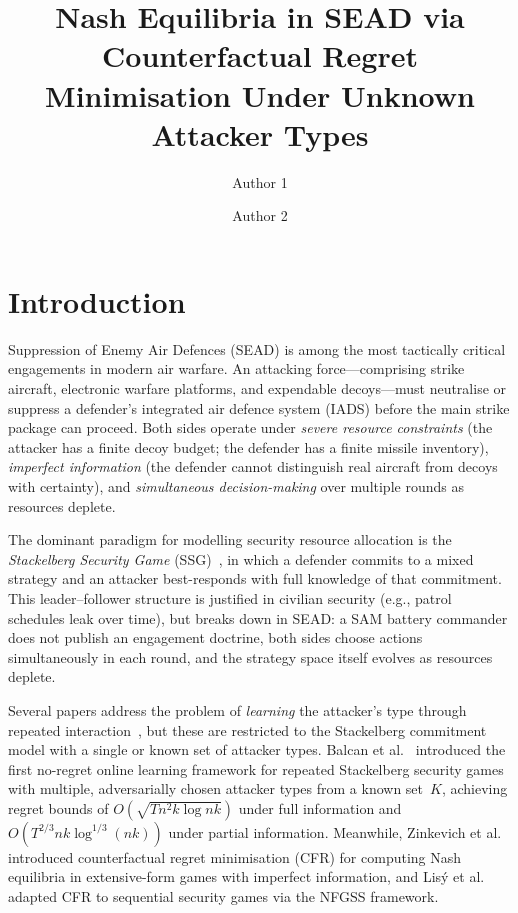 \documentclass[sigconf]{aamas}
\title{Nash Equilibria in SEAD via Counterfactual Regret Minimisation Under Unknown Attacker Types}
\author{Author 1}
\affiliation{
  \institution{IIT Madras}
  \city{Chennai}
  \country{India}}
\author{Author 2}
\affiliation{
  \institution{IIT Madras}
  \city{Chennai}
  \country{India}}
\begin{document}
\pagestyle{fancy}
\fancyhead{}

\maketitle

\section{Introduction}

Suppression of Enemy Air Defences (SEAD) is among the most tactically critical engagements in modern air warfare. An attacking force---comprising strike aircraft, electronic warfare platforms, and expendable decoys---must neutralise or suppress a defender's integrated air defence system (IADS) before the main strike package can proceed. Both sides operate under \emph{severe resource constraints} (the attacker has a finite decoy budget; the defender has a finite missile inventory), \emph{imperfect information} (the defender cannot distinguish real aircraft from decoys with certainty), and \emph{simultaneous decision-making} over multiple rounds as resources deplete.

The dominant paradigm for modelling security resource allocation is the \emph{Stackelberg Security Game} (SSG)~\cite{Tambe2012}, in which a defender commits to a mixed strategy and an attacker best-responds with full knowledge of that commitment. This leader--follower structure is justified in civilian security (e.g., patrol schedules leak over time), but breaks down in SEAD: a SAM battery commander does not publish an engagement doctrine, both sides choose actions simultaneously in each round, and the strategy space itself evolves as resources deplete.

Several papers address the problem of \emph{learning} the attacker's type through repeated interaction~\cite{Letchford2009, Marecki2012, Blum2014}, but these are restricted to the Stackelberg commitment model with a single or known set of attacker types. Balcan et al.~\cite{Balcan2015} introduced the first no-regret online learning framework for repeated Stackelberg security games with multiple, adversarially chosen attacker types from a known set~$K$, achieving regret bounds of $O(\sqrt{T n^2 k \log nk})$ under full information and $O(T^{2/3} nk \log^{1/3}(nk))$ under partial information. Meanwhile, Zinkevich et al.~\cite{Zinkevich2007} introduced counterfactual regret minimisation (CFR) for computing Nash equilibria in extensive-form games with imperfect information, and Lis\'{y} et al.~\cite{Lisy2016} adapted CFR to sequential security games via the NFGSS framework.
\end{document}
